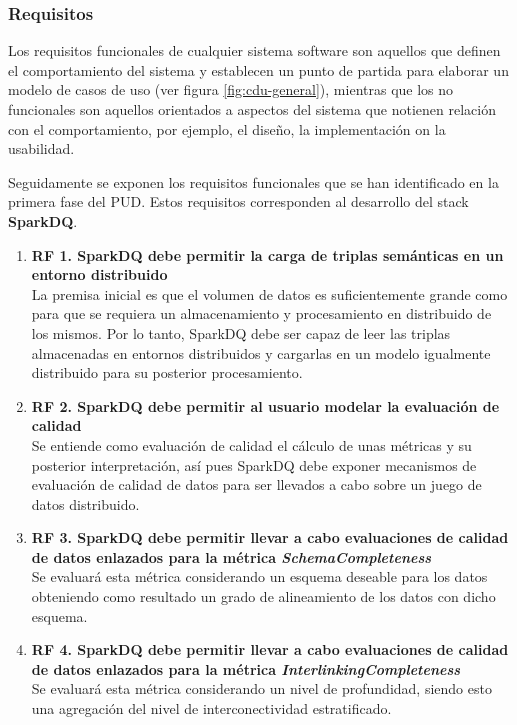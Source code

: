 

\subsubsection{Requisitos}

Los requisitos funcionales de cualquier sistema software son aquellos que definen el comportamiento del
sistema y establecen un punto de partida para elaborar un modelo de casos de
uso (ver figura \ref{fig:cdu-general}), mientras que los no funcionales son aquellos orientados a aspectos del
sistema que notienen relación con el comportamiento, por ejemplo, el diseño, la
implementación on la usabilidad. 

Seguidamente se exponen los requisitos funcionales que se han identificado en la
primera fase del \acs{PUD}. Estos requisitos corresponden al desarrollo del
stack \textbf{SparkDQ}.

\begin{enumerate}
\item \textbf{RF 1. SparkDQ debe permitir la carga de triplas semánticas en un entorno
  distribuido} \\La premisa inicial es que el volumen de datos es
  suficientemente grande como para que se requiera un almacenamiento y
  procesamiento en distribuido de los mismos. Por lo tanto, SparkDQ debe ser
  capaz de leer las triplas almacenadas en entornos distribuidos y cargarlas en
  un modelo igualmente distribuido para su posterior procesamiento.
  
\item \textbf{RF 2. SparkDQ debe permitir al usuario modelar la evaluación de
  calidad}\\Se entiende como evaluación de calidad el cálculo de unas métricas y
  su posterior interpretación, así pues SparkDQ debe exponer mecanismos de
  evaluación de calidad de datos para ser llevados a cabo sobre un juego de
  datos distribuido. 
\item \textbf{RF 3. SparkDQ debe permitir llevar a cabo evaluaciones de calidad de
  datos enlazados para la métrica \textit{SchemaCompleteness}}\\Se evaluará esta
  métrica considerando un esquema deseable para los datos obteniendo como
  resultado un grado de alineamiento de los datos con dicho esquema. 

\item \textbf{RF 4. SparkDQ debe permitir llevar a cabo evaluaciones de calidad de
  datos enlazados para la métrica \textit{InterlinkingCompleteness}}\\Se
  evaluará esta métrica considerando un nivel de profundidad, siendo esto una
  agregación del nivel de interconectividad estratificado. 
\end{enumerate}

